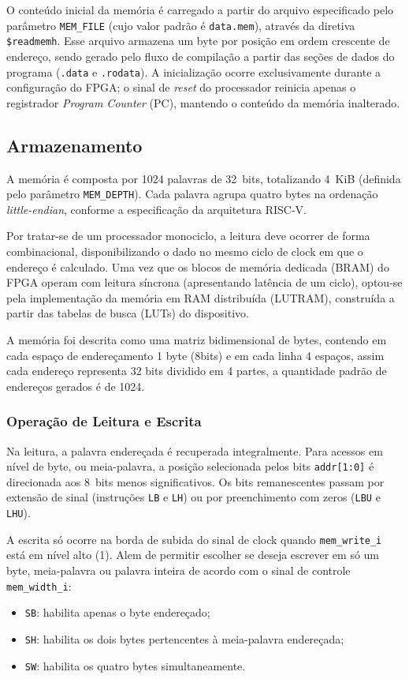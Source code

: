 O conteúdo inicial da memória é carregado a partir do arquivo especificado pelo parâmetro \texttt{MEM\_FILE} (cujo valor padrão é \texttt{data.mem}), através da diretiva \texttt{\$readmemh}. Esse arquivo armazena um byte por posição em ordem crescente de endereço, sendo gerado pelo fluxo de compilação a partir das seções de dados do programa (\texttt{.data} e \texttt{.rodata}). A inicialização ocorre exclusivamente durante a configuração do FPGA; o sinal de \textit{reset} do processador reinicia apenas o registrador \textit{Program Counter} (PC), mantendo o conteúdo da memória inalterado.

\subsection{Armazenamento}

A memória é composta por 1024 palavras de 32~bits, totalizando 4~KiB (definida pelo parâmetro \texttt{MEM\_DEPTH}). Cada palavra agrupa quatro bytes na ordenação \textit{little-endian}, conforme a especificação da arquitetura RISC-V. 

Por tratar-se de um processador monociclo, a leitura deve ocorrer de forma combinacional, disponibilizando o dado no mesmo ciclo de clock em que o endereço é calculado. Uma vez que os blocos de memória dedicada (BRAM) do FPGA operam com leitura síncrona (apresentando latência de um ciclo), optou-se pela implementação da memória em RAM distribuída (LUTRAM), construída a partir das tabelas de busca (LUTs) do dispositivo. 

A memória foi descrita como uma matriz bidimensional de bytes, contendo em cada espaço de endereçamento 1 byte (8bits) e em cada linha 4 espaços, assim cada endereço representa 32 bits dividido em 4 partes, a quantidade padrão de endereços gerados é de 1024.

\subsubsection{Operação de Leitura e Escrita}
\label{subsub:escritaLeitura}

Na leitura, a palavra endereçada é recuperada integralmente. Para acessos em nível de byte, ou meia-palavra, a posição selecionada pelos bits \texttt{addr[1:0]} é direcionada aos 8~bits menos significativos. Os bits remanescentes passam por extensão de sinal (instruções \texttt{LB} e \texttt{LH}) ou por preenchimento com zeros (\texttt{LBU} e \texttt{LHU}).

 A escrita só ocorre na borda de subida do sinal de clock quando \texttt{mem\_write\_i} está em nível alto (1). Alem de permitir escolher se deseja escrever em só um byte, meia-palavra ou palavra inteira de acordo com o sinal de controle \texttt{mem\_width\_i}:
\begin{itemize}
    \item \texttt{SB}: habilita apenas o byte endereçado;
    \item \texttt{SH}: habilita os dois bytes pertencentes à meia-palavra endereçada;
    \item \texttt{SW}: habilita os quatro bytes simultaneamente.
\end{itemize}

